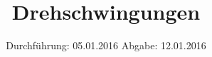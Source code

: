 
\subject{102}
\title{Drehschwingungen}
\date{
  Durchführung: 05.01.2016
  \hspace{3em}
  Abgabe: 12.01.2016
}



\maketitle
\newpage
\mbox{}
\newpage
\thispagestyle{empty}
\tableofcontents
\newpage






\nocite{numpy}
\nocite{matplotlib}
\nocite{uncertainties}
\printbibliography


